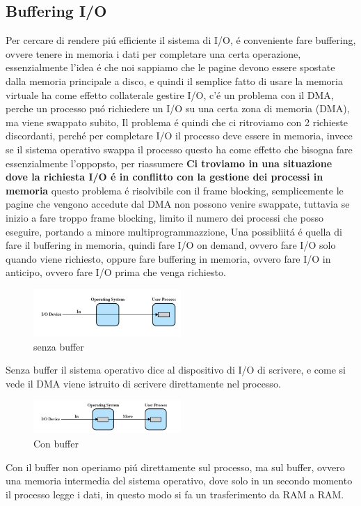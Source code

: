 \subsection{Buffering I/O}
Per cercare di rendere piú efficiente il sistema di I/O, é conveniente fare buffering, ovvere tenere in memoria i dati
per completare una certa operazione, essenzialmente l'idea é che noi sappiamo che  le pagine devono essere spostate
dalla memoria principale a disco, e quindi il semplice fatto di usare la memoria virtuale ha come effetto collaterale
gestire I/O, c'é un problema con il DMA, perche un processo puó richiedere un I/O su una certa zona di memoria (DMA), ma viene
swappato subito, Il problema é quindi che ci ritroviamo con 2 richieste discordanti, perché per completare I/O il processo deve essere in
memoria, invece se il sistema operativo swappa il processo questo ha come effetto che bisogna fare essenzialmente l'oppopsto, per riassumere
\textbf{Ci troviamo in una situazione dove la richiesta I/O é in conflitto con la gestione dei processi in memoria}
questo problema é risolvibile con il frame blocking, semplicemente le pagine che vengono accedute dal DMA non possono venire
swappate, tuttavia se inizio a fare troppo frame blocking, limito il numero dei processi che posso eseguire, portando a minore
multiprogrammazzione, Una possibliitá é quella di fare il buffering in memoria, quindi fare I/O on demand, ovvero fare I/O solo quando
viene richiesto, oppure fare buffering in memoria, ovvero fare I/O in anticipo, ovvero fare I/O prima che venga richiesto.
\begin{figure}[H]
    \centering
    \includegraphics[width=0.5\textwidth]{immagini/I_OSenzaBuffer}
    \caption{senza buffer}
\end{figure}
Senza buffer il sistema operativo dice al dispositivo di I/O di scrivere, e come si vede
il DMA viene istruito di scrivere direttamente nel processo.
\begin{figure}[H]
    \centering
    \includegraphics[width=0.5\textwidth]{immagini/I_OConBuffer}
    \caption{Con buffer}
\end{figure}
Con il buffer non operiamo piú direttamente sul processo, ma sul buffer, ovvero una memoria intermedia del sistema operativo,
dove solo in un secondo momento il processo legge i dati, in questo modo si fa un trasferimento da RAM a RAM.
